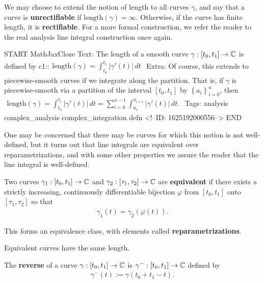 \documentclass{memoir}
\begin{document}
We may choose to extend the notion of length to all curves \(\gamma \), and say that a curve is \textbf{unrectifiable} if \(\textrm{length}(\gamma ) = \infty\). Otherwise, if the curve has finite length, it is \textbf{rectifiable}. For a more formal construction, we refer the reader to the real analysis line integral construction once again.\\

\begin{anki}
START
MathJaxCloze
Text: The length of a smooth curve \(\gamma:[t_0,t_1]\to \mathbb{C}\) is defined by
 {{c1::\(\begin{align*}
        	\textrm{length}(\gamma) = \int_{t_0}^{t_1} \left| \gamma '(t) \right| \,d t 
        \end{align*}\)}}
Extra: Of course, this extends to piecewise-smooth curves if we integrate along the partition. That is, if \(\gamma \) is piecewise-smooth via a partition of the interval \([t_0,t_1]\) by \(\left\{ a_i \right\}_{i=0}^{n}\), then
\(\begin{align*}
  	\textrm{length}(\gamma ) = \int_{t_0}^{t_1} \left| \gamma'(t) \right| \,d t = \sum_{i=0}^{n-1} \int_{a_i}^{a_{i+1}} \left| \gamma'(t) \right| \,d t.
  \end{align*}\)
Tags: analysis complex_analysis complex_integration defn
<!--ID: 1625192000556-->
END
\end{anki}

One may be concerned that there may be curves for which this notion is not well-defined, but it turns out that line integrals are equivalent over reparametrizations, and with some other properties we assure the reader that the line integral is well-defined.

\begin{defn}[Equivalence]
	Two curves \(\gamma_1:[t_0,t_1]\to \mathbb{C}\) and \(\gamma_2:[\tau_1,\tau_2]\to \mathbb{C}\) are \textbf{equivalent} if there exists a strictly increasing, continuously differentiable bijection \(\varphi \) from \([t_0,t_1]\) onto \([\tau_1,\tau_2]\) so that
	\begin{align*}
		\gamma_1(t) = \gamma_2(\varphi (t)).
	\end{align*}
\end{defn}
This forms an equivalence class, with elements called \textbf{reparametrizations}.
\begin{lemma}
	Equivalent curves have the same length.
\end{lemma}
\begin{defn}[Reverse]
	The \textbf{reverse} of a curve \(\gamma:[t_0,t_1]\to \mathbb{C}\) is \(\gamma^{-}:[t_0,t_1]\to \mathbb{C}\) defined by 
\begin{align*}
	\gamma^{-}(t) := \gamma (t_0+t_1-t).
\end{align*}
\end{defn}
\end{document}
